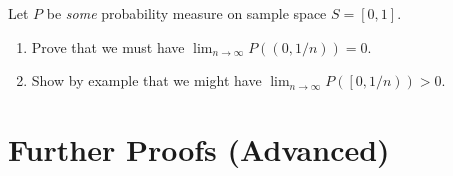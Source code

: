 \begin{problems}
    \item Let $P$ be \emph{some} probability measure on sample space $S=[0,1]$.
        \begin{enumerate}
            \item Prove that we must have $\lim_{n\to\infty}P((0,1/n))=0$.
            \item Show by example that we might have $\lim_{n\to\infty}P(\left[0,1/n\right))>0$.
        \end{enumerate}
\end{problems}

\section{Further Proofs (Advanced)}\label{ch2:adv_proofs}
\lipsum
